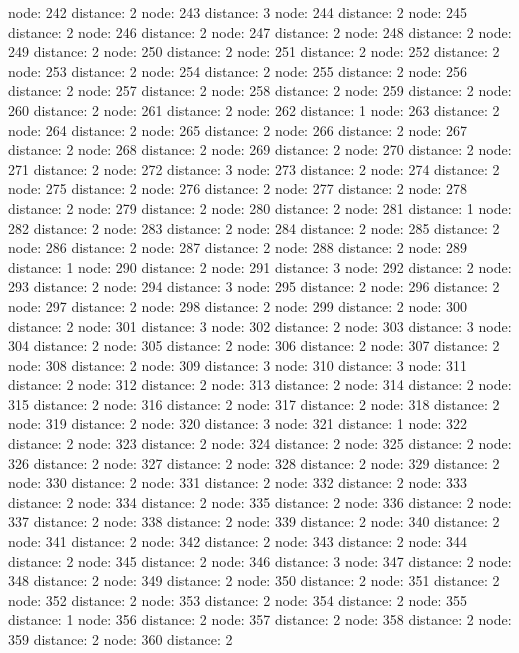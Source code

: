 \documentclass{article}
\begin{document}
node: 242 distance: 2
node: 243 distance: 3
node: 244 distance: 2
node: 245 distance: 2
node: 246 distance: 2
node: 247 distance: 2
node: 248 distance: 2
node: 249 distance: 2
node: 250 distance: 2
node: 251 distance: 2
node: 252 distance: 2
node: 253 distance: 2
node: 254 distance: 2
node: 255 distance: 2
node: 256 distance: 2
node: 257 distance: 2
node: 258 distance: 2
node: 259 distance: 2
node: 260 distance: 2
node: 261 distance: 2
node: 262 distance: 1
node: 263 distance: 2
node: 264 distance: 2
node: 265 distance: 2
node: 266 distance: 2
node: 267 distance: 2
node: 268 distance: 2
node: 269 distance: 2
node: 270 distance: 2
node: 271 distance: 2
node: 272 distance: 3
node: 273 distance: 2
node: 274 distance: 2
node: 275 distance: 2
node: 276 distance: 2
node: 277 distance: 2
node: 278 distance: 2
node: 279 distance: 2
node: 280 distance: 2
node: 281 distance: 1
node: 282 distance: 2
node: 283 distance: 2
node: 284 distance: 2
node: 285 distance: 2
node: 286 distance: 2
node: 287 distance: 2
node: 288 distance: 2
node: 289 distance: 1
node: 290 distance: 2
node: 291 distance: 3
node: 292 distance: 2
node: 293 distance: 2
node: 294 distance: 3
node: 295 distance: 2
node: 296 distance: 2
node: 297 distance: 2
node: 298 distance: 2
node: 299 distance: 2
node: 300 distance: 2
node: 301 distance: 3
node: 302 distance: 2
node: 303 distance: 3
node: 304 distance: 2
node: 305 distance: 2
node: 306 distance: 2
node: 307 distance: 2
node: 308 distance: 2
node: 309 distance: 3
node: 310 distance: 3
node: 311 distance: 2
node: 312 distance: 2
node: 313 distance: 2
node: 314 distance: 2
node: 315 distance: 2
node: 316 distance: 2
node: 317 distance: 2
node: 318 distance: 2
node: 319 distance: 2
node: 320 distance: 3
node: 321 distance: 1
node: 322 distance: 2
node: 323 distance: 2
node: 324 distance: 2
node: 325 distance: 2
node: 326 distance: 2
node: 327 distance: 2
node: 328 distance: 2
node: 329 distance: 2
node: 330 distance: 2
node: 331 distance: 2
node: 332 distance: 2
node: 333 distance: 2
node: 334 distance: 2
node: 335 distance: 2
node: 336 distance: 2
node: 337 distance: 2
node: 338 distance: 2
node: 339 distance: 2
node: 340 distance: 2
node: 341 distance: 2
node: 342 distance: 2
node: 343 distance: 2
node: 344 distance: 2
node: 345 distance: 2
node: 346 distance: 3
node: 347 distance: 2
node: 348 distance: 2
node: 349 distance: 2
node: 350 distance: 2
node: 351 distance: 2
node: 352 distance: 2
node: 353 distance: 2
node: 354 distance: 2
node: 355 distance: 1
node: 356 distance: 2
node: 357 distance: 2
node: 358 distance: 2
node: 359 distance: 2
node: 360 distance: 2
\end{document}
